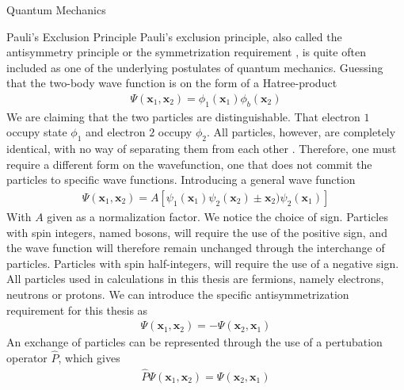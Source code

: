 \documentclass[twoside,english]{uiofysmaster}
\begin{document}
\begin{chapter}{Quantum Mechanics}
 	\begin{section}{Pauli's Exclusion Principle}
 		Pauli's exclusion principle, also called the antisymmetry principle or the symmetrization requirement \cite{Szabo,Griffiths}, is quite often included as one of the underlying postulates of quantum mechanics. Guessing that the two-body wave function is on the form of a Hatree-product
 		\begin{align}
 			\Psi(\mathbf{x}_1,\mathbf{x}_2) = \phi_1({\mathbf{x}_1}) \phi_b(\mathbf{x}_2)
 		\end{align}
 		We are claiming that the two particles are distinguishable. That electron $1$ occupy state $\phi_1$ and electron $2$ occupy $\phi_2$. All particles, however, are completely identical, with no way of separating them from each other \cite{Griffiths}. Therefore, one must require a different form on the wavefunction, one that does not commit the particles to specific wave functions. Introducing a general wave function
 		\begin{align}
 			\Psi(\mathbf{x}_1,\mathbf{x}_2) = A[\psi_1(\mathbf{x}_1) \psi_2(\mathbf{x}_2) \pm \mathbf{x}_2) \psi_2(\mathbf{x}_1)]
 		\end{align}
 		With $A$ given as a normalization factor. We notice the choice of sign. Particles with spin integers, named bosons, will require the use of the positive sign, and the wave function will therefore remain unchanged through the interchange of particles. Particles with spin half-integers, will require the use of a negative sign. All particles used in calculations in this thesis are fermions, namely electrons, neutrons or protons. We can introduce the specific antisymmetrization requirement for this thesis as
 		\begin{align}
 			\Psi(\mathbf{x}_1,\mathbf{x}_2) = -\Psi(\mathbf{x}_2,\mathbf{x}_1)
 		\end{align}
 		An exchange of particles can be represented through the use of a pertubation operator $\hat P$, which gives 
 		\begin{align}
 			\hat P \Psi(\mathbf{x}_1,\mathbf{x}_2) = \Psi(\mathbf{x}_2,\mathbf{x}_1)
 		\end{align}
 	\end{section}


\end{chapter}
\end{document}
